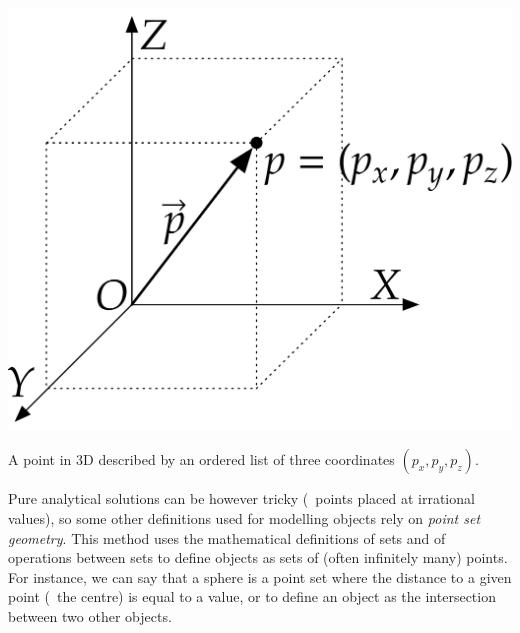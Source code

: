 \begin{marginfigure}
\centering
\includegraphics[width=\linewidth]{figs/point.pdf}
\caption[A point in 3D described by an ordered list of three coordinates]{A point in 3D described by an ordered list of three coordinates $(p_x,p_y,p_z)$.}%
\label{fig:point}
\end{marginfigure}

Pure analytical solutions can be however tricky (\eg\ points placed at irrational values), so some other definitions used for modelling objects rely on \emph{point set geometry}.
This method uses the mathematical definitions of sets and of operations between sets to define objects as sets of (often infinitely many) points.
For instance, we can say that a sphere is a point set where the distance to a given point (\ie\ the centre) is equal to a value, or to define an object as the intersection between two other objects.


